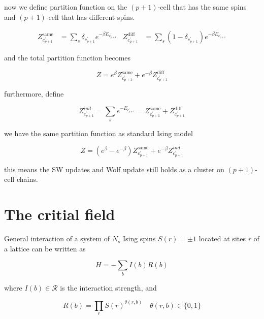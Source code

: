 \documentclass[11pt]{article}
\begin{document}
now we define partition function on the $(p+1)$-cell that has the same
spins and $(p+1)$-cell that has different spins.

\begin{equation}
    \begin{aligned}
        Z_{c^{\prime}_{p+1}}^{\text{same}} &= \sum_{s} \delta_{c_{p+1}^{\prime}} e^{-\beta E_{c^{\prime}_{p+1}}}
        &Z_{c^{\prime}_{p+1}}^{\text{diff}} &= \sum_{s} (1 - \delta_{c_{p+1}^{\prime}}) e^{-\beta E_{c^{\prime}_{p+1}}}
    \end{aligned}
\end{equation}

and the total partition function becomes

\begin{equation}
    Z = e^{\beta} Z_{c^{\prime}_{p+1}}^{\text{same}} + e^{-\beta}Z_{c^{\prime}_{p+1}}^{\text{diff}}
\end{equation}

furthermore, define

\begin{equation}
    Z_{c^{\prime}_{p+1}}^{ind} = \sum_{s} e^{-E_{c^{\prime}_{p+1}}} = Z_{c^{\prime}_{p+1}}^{\text{same}} + Z_{c^{\prime}_{p+1}}^{\text{diff}}
\end{equation}

we have the same partition function as standard Ising model

\begin{equation}
    Z = (e^{\beta} - e^{-\beta}) Z_{c^{\prime}_{p+1}}^{\text{same}} + e^{-\beta} Z_{c_{p+1}^{\prime}}^{ind}
\end{equation}

this means the SW updates and Wolf update still holds as a cluster
on $(p+1)$-cell chains.

\section{The critial field}

General interaction of a system of $N_s$ Ising spins $S(r) = \pm 1$ located at sites $r$ of a
lattice can be written as

\begin{equation}
    H = -\sum_b I(b) R(b)
\end{equation}

where $I(b) \in \mathcal{R}$ is the interaction strength, and

\begin{equation}
    R(b) = \prod_{r} S(r)^{\theta(r, b)} \quad \theta(r, b)\in \{0,1\}
\end{equation}
\end{document}
